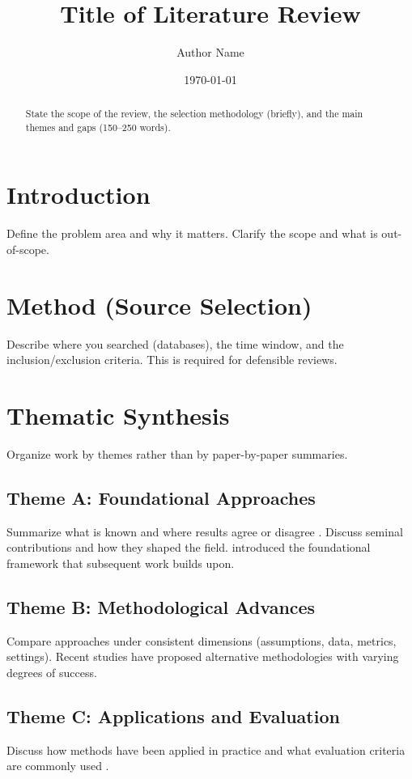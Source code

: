 \documentclass[11pt]{article}
\title{Title of Literature Review}
\author{Author Name}
\date{\today}
\begin{document}
\maketitle

\begin{abstract}
State the scope of the review, the selection methodology (briefly), and the main themes and gaps (150--250 words).
\end{abstract}

\section{Introduction}
Define the problem area and why it matters. Clarify the scope and what is out-of-scope.

\section{Method (Source Selection)}
Describe where you searched (databases), the time window, and the inclusion/exclusion criteria. This is required for defensible reviews.

\section{Thematic Synthesis}
Organize work by themes rather than by paper-by-paper summaries.

\subsection{Theme A: Foundational Approaches}
Summarize what is known and where results agree or disagree \citep{smith2023,jones2022}.
Discuss seminal contributions and how they shaped the field.
\citet{author2020} introduced the foundational framework that subsequent work builds upon.

\subsection{Theme B: Methodological Advances}
Compare approaches under consistent dimensions (assumptions, data, metrics, settings).
Recent studies \citep{other2021,diff2022} have proposed alternative methodologies with
varying degrees of success.

\subsection{Theme C: Applications and Evaluation}
Discuss how methods have been applied in practice and what evaluation criteria
are commonly used \citep{recent2023}.
\end{document}
